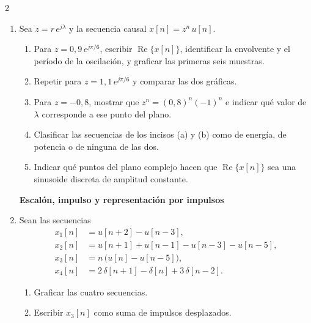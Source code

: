 \documentclass[10pt,a4paper]{article}
\begin{document}
\begin{multicols}{2}
\begin{enumerate}
		\textbf{La exponencial general: la secuencia $z^n$}

		\item Sea $z = r\,e^{j\lambda}$ y la secuencia causal
		$x[n] = z^n\,u[n]$.
		\begin{enumerate}
			\item Para $z = 0{,}9\,e^{j\pi/6}$, escribir
			$\operatorname{Re}\{x[n]\}$, identificar la envolvente y el período
			de la oscilación, y graficar las primeras seis muestras.
			\item Repetir para $z = 1{,}1\,e^{j\pi/6}$ y comparar las dos
			gráficas.
			\item Para $z = -0{,}8$, mostrar que $z^n = (0{,}8)^n(-1)^n$ e
			indicar qué valor de $\lambda$ corresponde a ese punto del plano.
			\item Clasificar las secuencias de los incisos (a) y (b) como de
			energía, de potencia o de ninguna de las dos.
			\item Indicar qué puntos del plano complejo hacen que
			$\operatorname{Re}\{x[n]\}$ sea una sinusoide discreta de amplitud
			constante.
		\end{enumerate}

		\textbf{Escalón, impulso y representación por impulsos}

		\item Sean las secuencias
		\begin{align*}
			x_1[n] &= u[n+2] - u[n-3], \\
			x_2[n] &= u[n+1] + u[n-1] - u[n-3] - u[n-5], \\
			x_3[n] &= n\,\big(u[n] - u[n-5]\big), \\
			x_4[n] &= 2\,\delta[n+1] - \delta[n] + 3\,\delta[n-2].
		\end{align*}
		\begin{enumerate}
			\item Graficar las cuatro secuencias.
			\item Escribir $x_3[n]$ como suma de impulsos desplazados.
		\end{enumerate}


\end{enumerate}
\end{multicols}
\end{document}

